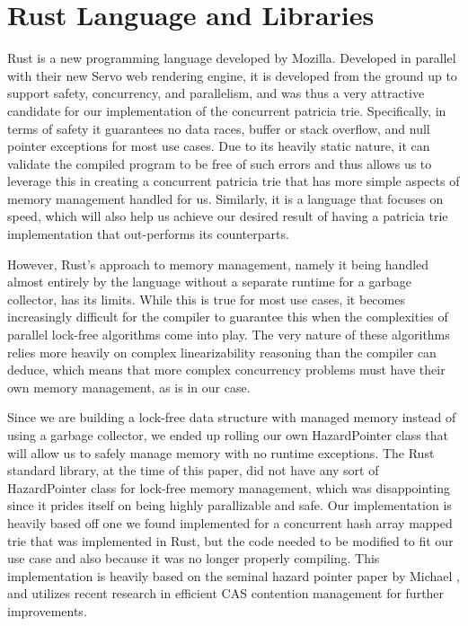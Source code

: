 \documentclass[conference]{IEEEtran}
\begin{document}
\section{Rust Language and Libraries}
Rust is a new programming language developed by Mozilla. Developed in parallel with their new Servo web rendering engine, it is developed from the ground up to support safety, concurrency, and parallelism, and was thus a very attractive candidate for our implementation of the concurrent patricia trie.\cite{MozillaResearch} Specifically, in terms of safety it guarantees no data races, buffer or stack overflow, and null pointer exceptions for most use cases. Due to its heavily static nature, it can validate the compiled program to be free of such errors and thus allows us to leverage this in creating a concurrent patricia trie that has more simple aspects of memory management handled for us. Similarly, it is a language that focuses on speed, which will also help us achieve our desired result of having a patricia trie implementation that out-performs its counterparts. 
\par
However, Rust's approach to memory management, namely it being handled almost entirely by the language without a separate runtime for a garbage collector, has its limits. While this is true for most use cases, it becomes increasingly difficult for the compiler to guarantee this when the complexities of parallel lock-free algorithms come into play. The very nature of these algorithms relies more heavily on complex linearizability reasoning than the compiler can deduce, which means that more complex concurrency problems must have their own memory management, as is in our case.
\par
Since we are building a lock-free data structure with managed memory instead of using a garbage collector, we ended up rolling our own HazardPointer class that will allow us to safely manage memory with no runtime exceptions. The Rust standard library, at the time of this paper, did not have any sort of HazardPointer class for lock-free memory management, which was disappointing since it prides itself on being highly parallizable and safe. Our implementation is heavily based off one we found implemented for a concurrent hash array mapped trie that was implemented in Rust\cite{CHAMT}, but the code needed to be modified to fit our use case and also because it was no longer properly compiling. This implementation is heavily based on the seminal hazard pointer paper by Michael \cite{Michael2004}, and utilizes recent research in efficient CAS contention management for further improvements.\cite{Dice2013}
\par
\end{document}

